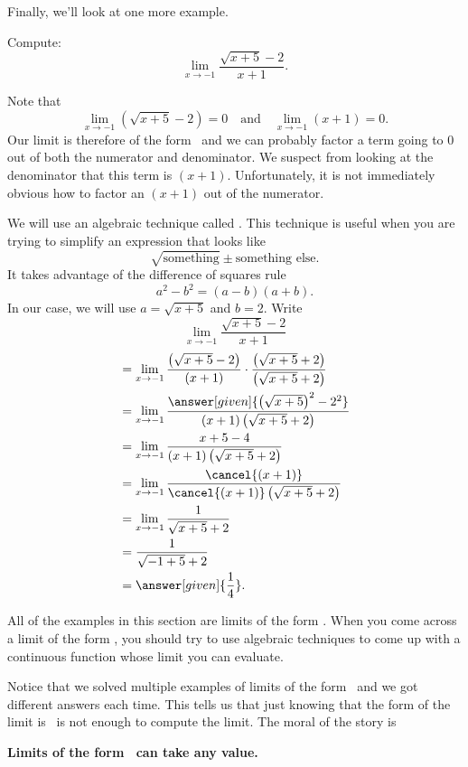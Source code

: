 \documentclass{ximera}
\begin{document}
Finally, we'll look at one more example.

\begin{example}
  Compute:
  \[
  \lim_{x\to-1} \frac{\sqrt{x+5}-2}{x+1}.
  \]

\begin{explanation} 
  Note that 
  \[
  \lim_{x\to-1} \left(\sqrt{x+5}-2\right)=0\quad\text{and}\quad\lim_{x\to -1} \left(x+1\right) =0.
  \]
  Our limit is therefore of the form \zeroOverZero\ and we
  can probably factor a term going to $0$ out of both the numerator
  and denominator.  We suspect from looking at the denominator that
  this term is $(x+1)$.  Unfortunately, it is not immediately obvious
  how to factor an $(x+1)$ out of the numerator.
 
  We will use an algebraic technique called .  This technique is useful when you are trying to
  simplify an expression that looks like
  \[
  \sqrt{\text{something}} \pm \text{something else}.
  \]
  It takes advantage of the difference of squares rule 
  \[
  a^2-b^2=(a-b)(a+b).
  \]
  In our case, we will use $a=\sqrt{x+5}$ and $b=2$.  Write
  \[
  \lim_{x\to-1} \frac{\sqrt{x+5}-2}{x+1}
  \]
  \begin{align*}
    &= \lim_{x\to-1} \frac{\left(\sqrt{x+5}-2\right)}{(x+1)} \cdot \frac{\left(\sqrt{x+5}+2\right)}{\left(\sqrt{x+5}+2\right)} \\
&=\lim_{x\to-1} \frac{\answer[given]{\left(\sqrt{x+5}\right)^2-2^2}}{(x+1)\left(\sqrt{x+5}+2\right)} \\
&=\lim_{x\to-1} \frac{x+5-4}{(x+1)\left(\sqrt{x+5}+2\right)} \\
&=\lim_{x\to-1} \frac{\cancel{(x+1)}}{\cancel{(x+1)}\left(\sqrt{x+5}+2\right)} \\
&=\lim_{x\to-1} \frac{1}{\sqrt{x+5}+2}\\
&= \frac{1}{\sqrt{-1+5}+2}\\
&=\answer[given]{\frac{1}{4}}.
\end{align*}
\end{explanation}
\end{example}

All of the examples in this section are limits of the form \zeroOverZero.
When you come across a limit of the form \zeroOverZero, you should try
to use algebraic techniques to come up with a continuous
function whose limit you can evaluate.

Notice that we solved multiple examples of limits of the form
\zeroOverZero\ and we got different answers each time.  This tells us
that just knowing that the form of the limit is \zeroOverZero\ is not enough
to compute the limit. The moral of the story is
\begin{center}
  \textbf{Limits of the form \zeroOverZero\ can take any value.}
\end{center}
\end{document}
